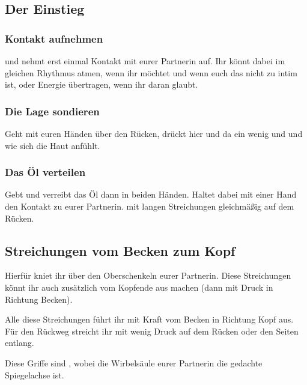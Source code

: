 \iftoggle{long}{
  \pagebreak
}{}
\subsection{Der Einstieg}

\subsubsection{Kontakt aufnehmen}
 und nehmt erst einmal Kontakt mit eurer Partnerin auf. Ihr könnt dabei im gleichen Rhythmus atmen, wenn ihr möchtet und wenn euch das nicht zu intim ist, oder Energie übertragen, wenn ihr daran glaubt.

\subsubsection{Die Lage sondieren}
Geht mit euren Händen über den Rücken, drückt hier und da ein wenig und  und wie sich die Haut anfühlt.

\subsubsection{Das Öl verteilen}

Gebt  und verreibt das Öl dann in beiden Händen. Haltet dabei mit einer Hand den Kontakt zu eurer Partnerin.  mit langen Streichungen gleichmäßig auf dem Rücken.


\pagebreak
\subsection{Streichungen vom Becken zum Kopf}
Hierfür kniet ihr über den Oberschenkeln eurer Partnerin. Diese Streichungen könnt ihr auch zusätzlich vom Kopfende aus machen (dann mit Druck in Richtung Becken).

Alle diese Streichungen führt ihr mit Kraft vom Becken in Richtung Kopf aus. Für den Rückweg streicht ihr mit wenig Druck auf dem Rücken oder den Seiten entlang.

Diese Griffe sind , wobei die Wirbelsäule eurer Partnerin die gedachte Spiegelachse ist.

